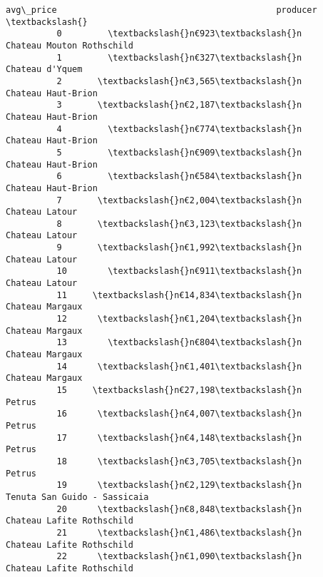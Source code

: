 \documentclass[11pt]{article}
\begin{document}
\begin{Verbatim}[commandchars=\\\{\}]
                   avg\_price                                           producer  \textbackslash{}
          0         \textbackslash{}n€923\textbackslash{}n                          Chateau Mouton Rothschild   
          1         \textbackslash{}n€327\textbackslash{}n                                    Chateau d'Yquem   
          2       \textbackslash{}n€3,565\textbackslash{}n                                 Chateau Haut-Brion   
          3       \textbackslash{}n€2,187\textbackslash{}n                                 Chateau Haut-Brion   
          4         \textbackslash{}n€774\textbackslash{}n                                 Chateau Haut-Brion   
          5         \textbackslash{}n€909\textbackslash{}n                                 Chateau Haut-Brion   
          6         \textbackslash{}n€584\textbackslash{}n                                 Chateau Haut-Brion   
          7       \textbackslash{}n€2,004\textbackslash{}n                                     Chateau Latour   
          8       \textbackslash{}n€3,123\textbackslash{}n                                     Chateau Latour   
          9       \textbackslash{}n€1,992\textbackslash{}n                                     Chateau Latour   
          10        \textbackslash{}n€911\textbackslash{}n                                     Chateau Latour   
          11     \textbackslash{}n€14,834\textbackslash{}n                                    Chateau Margaux   
          12      \textbackslash{}n€1,204\textbackslash{}n                                    Chateau Margaux   
          13        \textbackslash{}n€804\textbackslash{}n                                    Chateau Margaux   
          14      \textbackslash{}n€1,401\textbackslash{}n                                    Chateau Margaux   
          15     \textbackslash{}n€27,198\textbackslash{}n                                             Petrus   
          16      \textbackslash{}n€4,007\textbackslash{}n                                             Petrus   
          17      \textbackslash{}n€4,148\textbackslash{}n                                             Petrus   
          18      \textbackslash{}n€3,705\textbackslash{}n                                             Petrus   
          19      \textbackslash{}n€2,129\textbackslash{}n                       Tenuta San Guido - Sassicaia   
          20      \textbackslash{}n€8,848\textbackslash{}n                          Chateau Lafite Rothschild   
          21      \textbackslash{}n€1,486\textbackslash{}n                          Chateau Lafite Rothschild   
          22      \textbackslash{}n€1,090\textbackslash{}n                          Chateau Lafite Rothschild   

\end{Verbatim}
\end{document}
